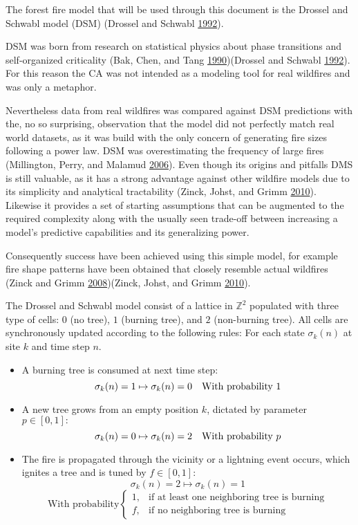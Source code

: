 \documentclass[
]{book}
\begin{document}
The forest fire model that will be used through this document is the Drossel and Schwabl model (DSM) (Drossel and Schwabl \protect\hyperlink{ref-drossel1992self}{1992}).

DSM was born from research on statistical physics about phase transitions and self-organized criticality (Bak, Chen, and Tang \protect\hyperlink{ref-bak1990forest}{1990})(Drossel and Schwabl \protect\hyperlink{ref-drossel1992self}{1992}). For this reason the CA was not intended as a modeling tool for real wildfires and was only a metaphor.

Nevertheless data from real wildfires was compared against DSM predictions with the, no so surprising, observation that the model did not perfectly match real world datasets, as it was build with the only concern of generating fire sizes following a power law. DSM was overestimating the frequency of large fires (Millington, Perry, and Malamud \protect\hyperlink{ref-millington2006models}{2006}). Even though its origins and pitfalls DMS is still valuable, as it has a strong advantage against other wildfire models due to its simplicity and analytical tractability (Zinck, Johst, and Grimm \protect\hyperlink{ref-zinck2010wildfire}{2010}). Likewise it provides a set of starting assumptions that can be augmented to the required complexity along with the usually seen trade-off between increasing a model's predictive capabilities and its generalizing power.

Consequently success have been achieved using this simple model, for example fire shape patterns have been obtained that closely resemble actual wildfires (Zinck and Grimm \protect\hyperlink{ref-zinck2008more}{2008})(Zinck, Johst, and Grimm \protect\hyperlink{ref-zinck2010wildfire}{2010}).

The Drossel and Schwabl model consist of a lattice in \(\mathds{Z}^2\) populated with three type of cells: \(0\) (no tree), \(1\) (burning tree), and \(2\) (non-burning tree). All cells are synchronously updated according to the following rules:
For each state \(\sigma_k(n)\) at site \(k\) and time step \(n\).

\begin{itemize}
\item
  A burning tree is consumed at next time step:
  \[\sigma_k(n) = 1 \mapsto  \sigma_k(n) = 0 \textrm{\quad With probability}\ 1\]
\item
  A new tree grows from an empty position \(k\), dictated by parameter \(p \in [0,1]:\)
  \[\sigma_k(n) = 0 \mapsto  \sigma_k(n) = 2 \textrm{\quad With probability}\ p\]
\item
  The fire is propagated through the vicinity or a lightning event occurs, which ignites a tree and is tuned by \(f \in [0,1]:\)
  \[\sigma_k(n) = 2 \mapsto  \sigma_k(n) = 1\]
  \[\textrm{With probability} \begin{cases}
  1, & \textrm{if at least one neighboring tree is burning}\\
  f, & \textrm{if no neighboring tree is burning}
  \end{cases}\]
\end{itemize}
\end{document}
